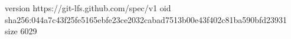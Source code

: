version https://git-lfs.github.com/spec/v1
oid sha256:044a7c43f25fe5165ebfe23ce2032cabad7513b00e43f402c81ba590bfd23931
size 6029

